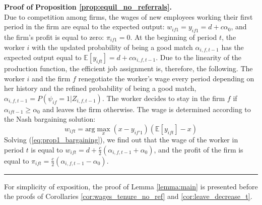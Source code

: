 \documentclass[12pt]{article}
\newenvironment{proof}[1][Proof of]{\noindent\textbf{#1} }{\ \rule{0.5em}{0.5em}}
\begin{document}
\begin{proof}
\textbf{Proposition \ref{prop:equil_no_referrals}.}\\
Due to competition among firms, the wages of new employees working their first period in the firm are equal to the expected output: $w_{if1} = y_{if1}= d + c\alpha_{0}$, and the firm's profit is equal to zero: $\pi_{if1} = 0$. At the beginning of period $t$, the worker $i$ with the updated probability of being a good match $\alpha_{i,f,t-1}$ has the expected output equal to $\mathbb{E}[y_{ift}] = d+c\alpha_{i,f,t-1}$. Due to the linearity of the production function, the efficient job assignment is, therefore, the following. The worker $i$ and the firm $f$ renegotiate the worker's wage every period depending on her history and the refined probability of being a good match, $\alpha_{i,f,t-1} = P(\psi_{if}=1 \vert  Z_{i,f,t-1})$. The worker decides to stay in the firm $f$ if $\alpha_{ift-1} \geq \alpha_0$ and leaves the firm otherwise. The wage is determined according to the Nash bargaining solution:
\begin{equation}\label{eq:prop1_bargaining}
w_{ift} = \text{arg}\max_{x}(x-y_{if'1})(\mathbb{E}[y_{ift}]-x)
\end{equation}
Solving (\ref{eq:prop1_bargaining}), we find out that the wage of the worker in period $t$ is equal to $w_{ift} = d+\frac{c}{2}(\alpha_{i,f,t-1}+\alpha_0)$, and the profit of the firm is equal to $\pi_{ift} = \frac{c}{2}(\alpha_{i,f,t-1}-\alpha_0)$. 
\end{proof}

For simplicity of exposition, the proof of Lemma \ref{lemma:main} is presented before the proofs of Corollaries \ref{cor:wages_tenure_no_ref} and \ref{cor:leave_decrease_t}.
\end{document}
